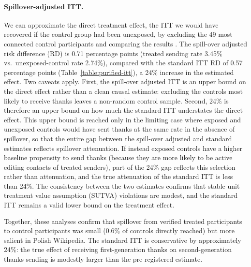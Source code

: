 \documentclass[9pt,twoside,lineno]{pnas-new}
\begin{document}
\paragraph{Spillover-adjusted ITT.} We can approximate the direct treatment effect, the ITT we would have recovered if the control group had been unexposed, by excluding the 49 most connected control participants and comparing the results \cite{gerber_field_2012}. The spill-over adjusted risk difference (RD) is 0.71 percentage points (treated sending rate 3.45\% vs.\ unexposed-control rate 2.74\%), compared with the standard ITT RD of 0.57 percentage points (Table~\ref{table:purified-itt}), a 24\% increase in the estimated effect. Two caveats apply. First, the spill-over adjusted ITT is an upper bound on the direct effect rather than a clean causal estimate: excluding the controls most likely to receive thanks leaves a non-random control sample. Second, 24\% is therefore an upper bound on how much the standard ITT understates the direct effect. This upper bound is reached only in the limiting case where exposed and unexposed controls would have sent thanks at the same rate in the absence of spillover, so that the entire gap between the spill-over adjusted and standard estimates reflects spillover attenuation. If instead exposed controls have a higher baseline propensity to send thanks (because they are more likely to be active editing contacts of treated senders), part of the 24\% gap reflects this selection rather than attenuation, and the true attenuation of the standard ITT is less than 24\%. The consistency between the two estimates confirms that stable unit treatment value assumption (SUTVA) violations are modest, and the standard ITT remains a valid lower bound on the treatment effect.


Together, these analyses confirm that spillover from verified treated participants to control participants was small (0.6\% of controls directly reached) but more salient in Polish Wikipedia. The standard ITT is conservative by approximately 24\%: the true effect of receiving first-generation thanks on second-generation thanks sending is modestly larger than the pre-registered estimate.
\end{document}
